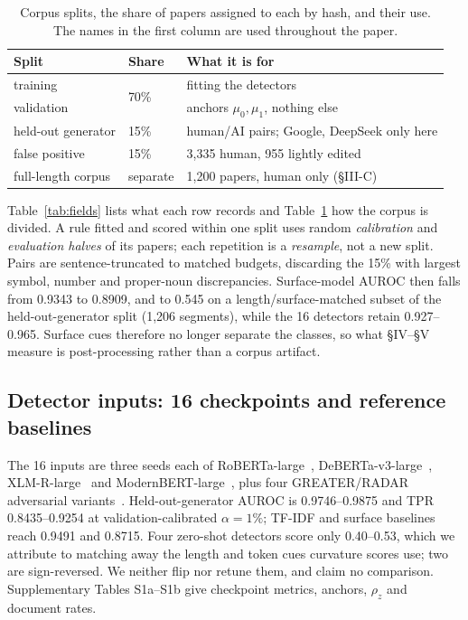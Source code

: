 \documentclass[10pt,conference,a4paper]{IEEEtran}
\newcommand{\sect}[1]{\S#1}
\begin{document}
\begin{table}[t]
\caption{Corpus splits, the share of papers assigned to each by hash, and their use.
The names in the first column are used throughout the paper.}
\label{tab:splits}
\centering
\scriptsize
\setlength{\tabcolsep}{2.5pt}
\begin{tabular}{@{}lll@{}}
\toprule
Split & Share & What it is for \\
\midrule
training              & \multirow{2}{*}{70\%} & fitting the detectors \\
validation            &                       & anchors $\mu_0,\mu_1$, nothing else \\
held-out generator    & 15\%                  & human/AI pairs; Google, DeepSeek only here \\
false positive        & 15\%                  & 3{,}335 human, 955 lightly edited \\
full-length corpus    & separate              & 1{,}200 papers, human only (\sect{III-C}) \\
\bottomrule
\end{tabular}
\end{table}

Table~\ref{tab:fields} lists what each row records and Table~\ref{tab:splits} how the
corpus is divided. A rule fitted and scored within one split uses random
\emph{calibration} and \emph{evaluation halves} of its papers; each repetition is a
\emph{resample}, not a new split. Pairs are
sentence-truncated to matched budgets, discarding the 15\%
with
largest symbol, number and proper-noun discrepancies. Surface-model AUROC then falls
from 0.9343 to 0.8909, and to 0.545 on a length/surface-matched subset of the
held-out-generator split (1{,}206 segments), while the 16 detectors retain
0.927--0.965. Surface cues therefore no longer separate the classes, so what
\sect{IV}--\sect{V} measure is post-processing rather than a corpus artifact.

\subsection{Detector inputs: 16 checkpoints and reference baselines}
The 16 inputs are three seeds each of
RoBERTa-large~\cite{roberta2019}, DeBERTa-v3-large~\cite{deberta2023},
XLM-R-large~\cite{xlmr2020} and ModernBERT-large~\cite{modernbert2024}, plus four
GREATER/RADAR adversarial variants~\cite{greater2025,radar2023}. Held-out-generator AUROC is
0.9746--0.9875 and TPR 0.8435--0.9254 at validation-calibrated $\alpha=1\%$; TF-IDF and
surface baselines reach 0.9491 and 0.8715. Four zero-shot detectors score only
0.40--0.53, which we attribute to matching away the length and token cues curvature
scores use; two are sign-reversed. We neither flip nor retune them, and claim no
comparison. Supplementary Tables S1a--S1b give checkpoint metrics, anchors, $\rho_z$ and
document rates.
\end{document}
